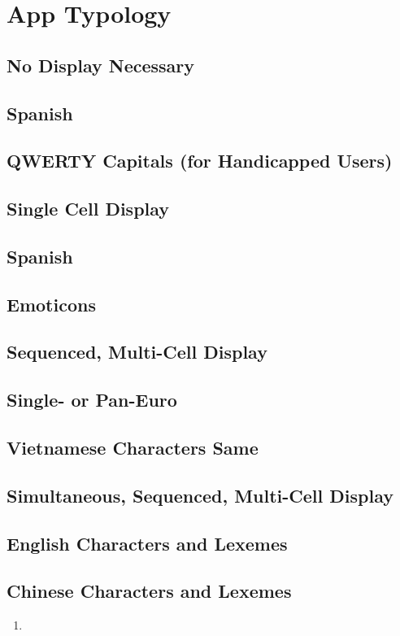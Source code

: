 \chapter{App Typology}\label{app-typology}

\section{No Display Necessary}\label{no-display-necessary}
\section{Spanish}\label{spanish}
\section{QWERTY Capitals (for Handicapped
Users)}\label{qwerty-capitals-for-handicapped-users}

\section{Single Cell Display}\label{single-cell-display}
\section{Spanish}\label{spanish-1}
\section{Emoticons}\label{emoticons}
\section{Sequenced, Multi-Cell
Display}\label{sequenced-multi-cell-display}

\section{Single- or Pan-Euro}\label{single--or-pan-euro}
\section{Vietnamese Characters
Same}\label{vietnamese-characters-same}

\section{Simultaneous, Sequenced, Multi-Cell
Display}\label{simultaneous-sequenced-multi-cell-display}

\section{English Characters and
Lexemes}\label{english-characters-and-lexemes}

\section{Chinese Characters and
Lexemes}\label{chinese-characters-and-lexemes}

\begin{enumerate}
\def\labelenumi{\arabic{enumi}.}
\setcounter{enumi}{6}
\tightlist
\item
\end{enumerate}
